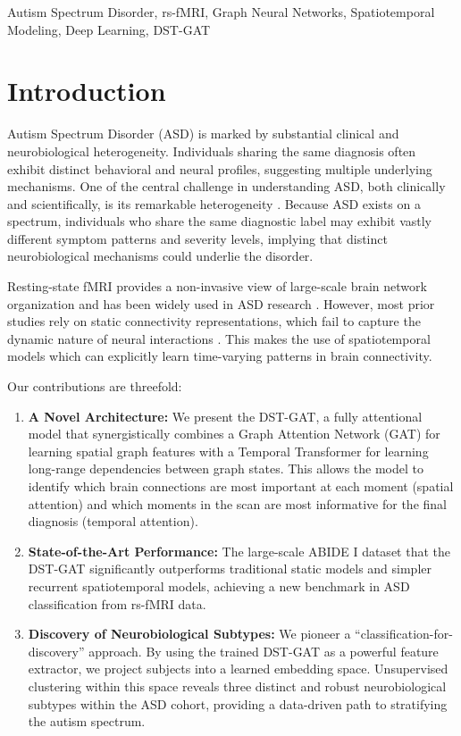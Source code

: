 \documentclass[10pt]{article}
\begin{document}
Autism Spectrum Disorder, rs-fMRI, Graph Neural Networks, Spatiotemporal Modeling, Deep Learning, DST-GAT

\section{Introduction}
Autism Spectrum Disorder (ASD) is marked by substantial clinical and neurobiological heterogeneity. Individuals sharing the same diagnosis often exhibit distinct behavioral and neural profiles, suggesting multiple underlying mechanisms.
One of the central challenge in understanding ASD, both clinically and scientifically, is its remarkable heterogeneity \parencite{apa2013dsm5, lombardo2019autism}. Because ASD exists on a spectrum, individuals who share the same diagnostic label may exhibit vastly different symptom patterns and severity levels, implying that distinct neurobiological mechanisms could underlie the disorder.

Resting-state fMRI provides a non-invasive view of large-scale brain
network organization and has been widely used in ASD research \parencite{biswal1995functional}.
However, most prior studies rely on static connectivity representations,
which fail to capture the dynamic nature of neural interactions \parencite{hutchison2013dynamic}. This
makes the use of spatiotemporal models which can explicitly learn
time-varying patterns in brain connectivity.


Our contributions are threefold:
\begin{enumerate}
    \item \textbf{A Novel Architecture:} We present the DST-GAT, a fully attentional model that synergistically combines a Graph Attention Network (GAT) for learning spatial graph features with a Temporal Transformer for learning long-range dependencies between graph states. This allows the model to identify which brain connections are most important at each moment (spatial attention) and which moments in the scan are most informative for the final diagnosis (temporal attention).
    \item \textbf{State-of-the-Art Performance:} The large-scale ABIDE I dataset that the DST-GAT significantly outperforms traditional static models and simpler recurrent spatiotemporal models, achieving a new benchmark in ASD classification from rs-fMRI data.
    \item \textbf{Discovery of Neurobiological Subtypes:} We pioneer a ``classification-for-discovery'' approach. By using the trained DST-GAT as a powerful feature extractor, we project subjects into a learned embedding space. Unsupervised clustering within this space reveals three distinct and robust neurobiological subtypes within the ASD cohort, providing a data-driven path to stratifying the autism spectrum.
\end{enumerate}
\end{document}
